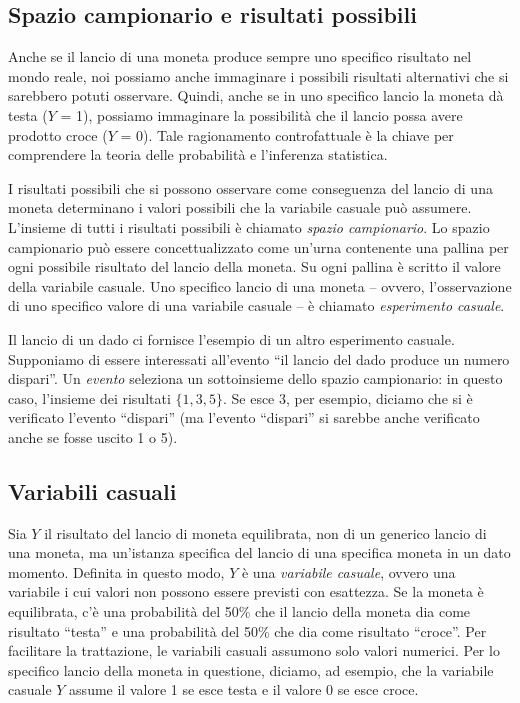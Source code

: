 \documentclass[
  11pt,
]{krantz}
\theoremstyle{definition}
\theoremstyle{definition}
\theoremstyle{definition}
\theoremstyle{definition}
\theoremstyle{remark}
\begin{document}
\hypertarget{spazio-campionario-e-risultati-possibili}{%
\subsection{Spazio campionario e risultati possibili}\label{spazio-campionario-e-risultati-possibili}}

Anche se il lancio di una moneta produce sempre uno specifico risultato nel mondo reale, noi possiamo anche immaginare i possibili risultati alternativi che si sarebbero potuti osservare. Quindi, anche se in uno specifico lancio la moneta dà testa (\(Y\) = 1), possiamo immaginare la possibilità che il lancio possa avere prodotto croce (\(Y\) = 0). Tale ragionamento controfattuale è la chiave per comprendere la teoria delle probabilità e l'inferenza statistica.

I risultati possibili che si possono osservare come conseguenza del lancio di una moneta determinano i valori possibili che la variabile casuale può assumere. L'insieme di tutti i risultati possibili è chiamato \emph{spazio campionario}. Lo spazio campionario può essere concettualizzato come un'urna contenente una pallina per ogni possibile risultato del lancio della moneta. Su ogni pallina è scritto il valore della variabile casuale. Uno specifico lancio di una moneta -- ovvero, l'osservazione di uno specifico valore di una variabile casuale -- è chiamato \emph{esperimento casuale}.

Il lancio di un dado ci fornisce l'esempio di un altro esperimento casuale. Supponiamo di essere interessati all'evento ``il lancio del dado produce un numero dispari''. Un \emph{evento} seleziona un sottoinsieme dello spazio campionario: in questo caso, l'insieme dei risultati \(\{1, 3, 5\}\). Se esce 3, per esempio, diciamo che si è verificato l'evento ``dispari'' (ma l'evento ``dispari'' si sarebbe anche verificato anche se fosse uscito 1 o 5).

\hypertarget{variabili-casuali}{%
\subsection{Variabili casuali}\label{variabili-casuali}}

Sia \(Y\) il risultato del lancio di moneta equilibrata, non di un generico lancio di una moneta, ma un'istanza specifica del lancio di una specifica moneta in un dato momento. Definita in questo modo, \(Y\) è una \emph{variabile casuale}, ovvero una variabile i cui valori non possono essere previsti con esattezza. Se la moneta è equilibrata, c'è una probabilità del 50\% che il lancio della moneta dia come risultato ``testa'' e una probabilità del 50\% che dia come risultato ``croce''. Per facilitare la trattazione, le variabili casuali assumono solo valori numerici. Per lo specifico lancio della moneta in questione, diciamo, ad esempio, che la variabile casuale \(Y\) assume il valore 1 se esce testa e il valore 0 se esce croce.
\end{document}
